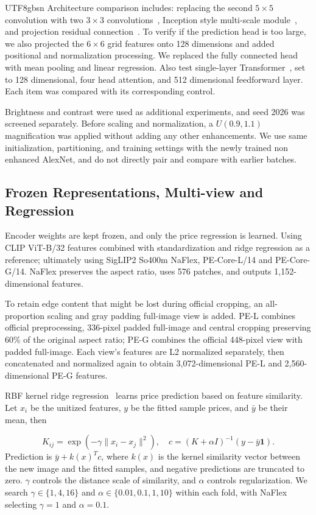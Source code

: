 \documentclass[conference,a4paper]{IEEEtran}
\begin{document}
\begin{CJK*}{UTF8}{gbsn}
Architecture comparison includes: replacing the second $5\times5$ convolution with two $3\times3$ convolutions~\cite{vgg}, Inception style multi-scale module~\cite{inception}, and projection residual connection~\cite{resnet}. To verify if the prediction head is too large, we also projected the $6\times6$ grid features onto 128 dimensions and added positional and normalization processing. We replaced the fully connected head with mean pooling and linear regression. Also test single-layer Transformer~\cite{transformer}, set to 128 dimensional, four head attention, and 512 dimensional feedforward layer. Each item was compared with its corresponding control.

Brightness and contrast were used as additional experiments, and seed 2026 was screened separately. Before scaling and normalization, a $U(0.9,1.1)$ magnification was applied without adding any other enhancements. We use same initialization, partitioning, and training settings with the newly trained non enhanced AlexNet, and do not directly pair and compare with earlier batches.

\subsection{Frozen Representations, Multi-view and Regression}
Encoder weights are kept frozen, and only the price regression is learned. Using CLIP ViT-B/32 features combined with standardization and ridge regression as a reference; ultimately using SigLIP2 So400m NaFlex, PE-Core-L/14 and PE-Core-G/14. NaFlex preserves the aspect ratio, uses 576 patches, and outputs 1,152-dimensional features.

To retain edge content that might be lost during official cropping, an all-proportion scaling and gray padding full-image view is added. PE-L combines official preprocessing, 336-pixel padded full-image and central cropping preserving 60\% of the original aspect ratio; PE-G combines the official 448-pixel view with padded full-image. Each view's features are L2 normalized separately, then concatenated and normalized again to obtain 3,072-dimensional PE-L and 2,560-dimensional PE-G features.

RBF kernel ridge regression~\cite{krr} learns price prediction based on feature similarity. Let $x_i$ be the unitized features, $y$ be the fitted sample prices, and $\bar y$ be their mean, then

\begin{equation}
 K_{ij}=\exp(-\gamma\|x_i-x_j\|^2),\quad
 c=(K+\alpha I)^{-1}(y-\bar y\mathbf{1}).
\end{equation}
Prediction is $\bar y+k(x)^Tc$, where $k(x)$ is the kernel similarity vector between the new image and the fitted samples, and negative predictions are truncated to zero. $\gamma$ controls the distance scale of similarity, and $\alpha$ controls regularization. We search $\gamma\in\{1,4,16\}$ and $\alpha\in\{0.01,0.1,1,10\}$ within each fold, with NaFlex selecting $\gamma=1$ and $\alpha=0.1$.


\end{CJK*}
\end{document}
